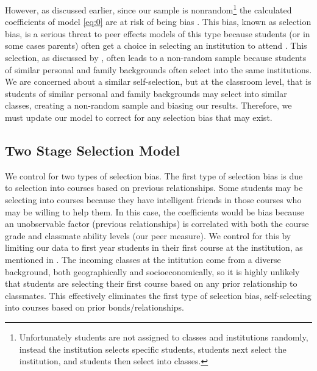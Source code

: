 However, as discussed earlier, since our sample is nonrandom\footnote{Unfortunately students are not assigned to classes and institutions randomly, instead the institution selects specific students, students next select the institution, and students then select into classes.} the calculated coefficients of model \eqref{eq:0} are at risk of being bias \citep{heckman1979sample}.  
This bias, known as selection bias, is a serious threat to peer effects models of this type because students (or in some cases parents) often get a choice in selecting an institution to attend \citep{carman2012classroom,burke2013classroom,ding2007peers}. 
This selection, as discussed by \citet{kang2007classroom}, often leads to a non-random sample because students of similar personal and family backgrounds often select into the same institutions.
We are concerned about a similar self-selection, but at the classroom level, that is students of similar personal and family backgrounds may select into similar classes, creating a non-random sample and biasing our results.
Therefore, we must update our model to correct for any selection bias that may exist.

\subsection{Two Stage Selection Model}\label{methods:tssmodel}

We control for two types of selection bias. 
The first type of selection bias is due to selection into courses based on previous relationships. 
Some students may be selecting into courses because they have intelligent friends in those courses who may be willing to help them.
In this case, the coefficients would be bias because an unobservable factor (previous relationships) is correlated with both the course grade and classmate ability levels (our peer measure). 
We control for this by limiting our data to first year students in their first course at the institution, as mentioned in .
The incoming classes at the intitution come from a diverse background, both geographically and socioeconomically, so it is highly unlikely that students are selecting their first course based on any prior relationship to classmates.
This effectively eliminates the first type of selection bias, self-selecting into courses based on prior bonds/relationships.

